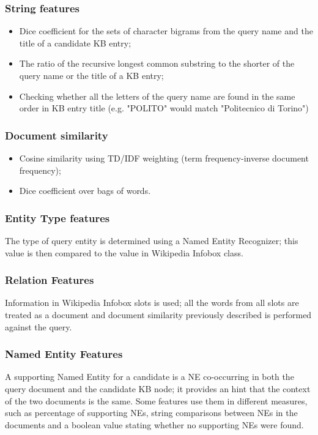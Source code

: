 \documentclass[a4paper,11pt]{report}
\begin{document}
\subsubsection{String features}
\begin{itemize}
\item Dice coefficient for the sets of character bigrams from the query name and the title of a candidate KB entry;
\item The ratio of the recursive longest common substring to the shorter of the query name or the title of a KB entry;
\item Checking whether all the letters of the query name are found in the same order in KB entry title (e.g. "POLITO" would match "Politecnico di Torino")
\end{itemize}
\subsubsection{Document similarity}
\begin{itemize}
\item Cosine similarity using TD/IDF weighting (term frequency-inverse document frequency);
\item Dice coefficient over bags of words.
\end{itemize}
\subsubsection{Entity Type features}
The type of query entity is determined using a Named Entity Recognizer; this value is then compared to the value in Wikipedia Infobox class.
\subsubsection{Relation Features}
Information in Wikipedia Infobox slots is used; all the words from all slots are treated as a document and document similarity previously described is performed against the query.
\subsubsection{Named Entity Features}
A supporting Named Entity for a candidate is a NE co-occurring in both the query document and the candidate KB node; it provides an hint that the context of the two documents is the same. Some features use them in different measures, such as percentage of supporting NEs, string comparisons between NEs in the documents and a boolean value stating whether no supporting NEs were found.
\end{document}
